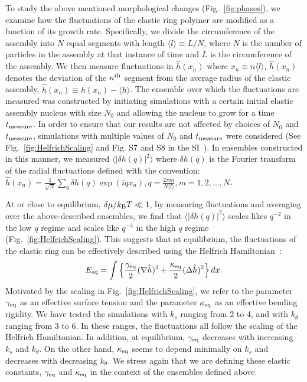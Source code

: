 \documentclass[amsmath,preprintnumbers,10pt,nofootinbib,prl,twocolumn]{revtex4-1}
\begin{document}
To study the above mentioned morphological changes (Fig.~\ref{fig:phases}), we examine how the fluctuations of the elastic ring polymer are modified as a function of its growth rate. Specifically, we divide the circumference of the assembly into $N$ equal segments with length $\langle l \rangle \equiv L/N$, where $N$ is the number of particles in the assembly at that instance of time and $L$ is the circumference of the assembly. 
 We then measure fluctuations in $\hat{h}(x_n)$ where $x_n\equiv n\langle l \rangle$, $\hat{h}(x_n)$ denotes the deviation of the $n^{\rm th}$ segment from the average radius of the elastic assembly, $\hat{h}(x_n)\equiv h(x_n) -\langle h \rangle$. The ensemble over which the fluctuations are measured was constructed by initiating simulations with a certain initial elastic assembly nucleus with size $N_0$ and allowing the nucleus to grow for a time $t_{\rm measure}$. In order to ensure that our results are not affected by choices of $N_0$ and $t_{\rm measure}$, simulations with multiple values of $N_0$ and $t_{\rm measure}$ were considered (See Fig.~\ref{fig:HelfrichScaling} and Fig. S7 and S8 in the SI~\cite{Supplementary}). In ensembles constructed in this manner, we measured $\langle |\delta h(q)|^2 \rangle$ where $\delta h(q)$ is the Fourier transform of the radial fluctuations defined with the convention: $\hat{h}(x_n)=\frac{1}{\sqrt{N}}\sum _q \delta h(q) \exp(iqx_n), q = \frac{2\pi m}{N\langle l \rangle}, m = 1, 2,...,N$. 

At or close to equilibrium, $\delta \mu /k_{\rm B} T \ll 1$, by measuring fluctuations and averaging over the above-described ensembles, we find that $\langle |\delta h(q)|^2 \rangle$ scales likes $q^{-2}$ in the low $q$ regime and scales like $q^{-4}$ in the high $q$ regime (Fig.~\ref{fig:HelfrichScaling}). This suggests that 
at equilibrium, the fluctuations of the elastic ring can be effectively described using the Helfrich Hamiltonian~\cite{W.Helfrich1973}:
\begin{equation}
E_{\rm eq}=\int \left \{\frac{\gamma_{\rm eq}}{2} (\nabla \hat{h})^2+  \frac{\kappa_{\rm eq}}{2} (\Delta \hat{h})^2\right \} dx.
\label{eq:Helfrich}
\end{equation}
Motivated by the scaling in Fig.~\ref{fig:HelfrichScaling}, we refer to the parameter $\gamma_{\rm eq}$ as an effective surface tension and the parameter $\kappa_{\rm eq}$ as an effective bending rigidity. We have tested the simulations with $k_s$ ranging from 2 to 4, and with $k_\theta$ ranging from 3 to 6. In these ranges, the fluctuations all follow the scaling of the Helfrich Hamiltonian. In addition, at equilibrium, $\gamma_{\rm eq}$ decreases with increasing $k_s$ and $k_{\theta}$. On the other hand, $\kappa_{\rm eq}$ seems to depend minimally on $k_s$ and decreases with decreasing $k_{\theta}$. We stress again that we are defining these elastic constants, $\gamma_{\rm eq}$ and $\kappa_{\rm eq}$ in the context of the ensembles defined above. 
\end{document}
